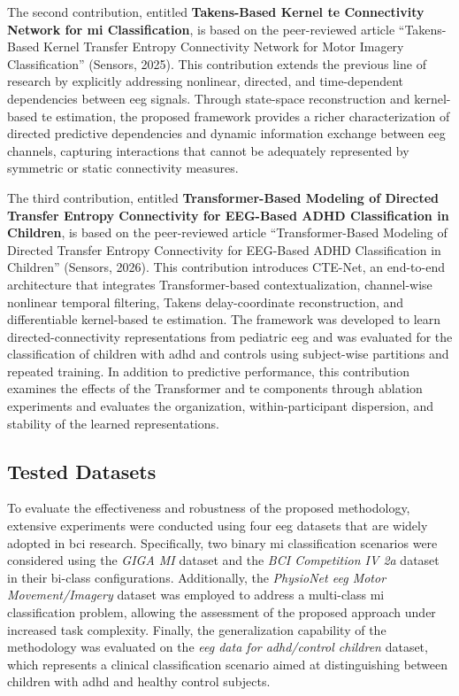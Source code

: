 The second contribution, entitled \textbf{Takens-Based Kernel \gls{te} Connectivity Network for \gls{mi} Classification}, is based on the peer-reviewed article ``Takens-Based Kernel Transfer Entropy Connectivity Network for Motor Imagery Classification'' (Sensors, 2025). This contribution extends the previous line of research by explicitly addressing nonlinear, directed, and time-dependent dependencies between \gls{eeg} signals. Through state-space reconstruction and kernel-based \gls{te} estimation, the proposed framework provides a richer characterization of directed predictive dependencies and dynamic information exchange between \gls{eeg} channels, capturing interactions that cannot be adequately represented by symmetric or static connectivity measures.

The third contribution, entitled \textbf{Transformer-Based Modeling of Directed Transfer Entropy Connectivity for EEG-Based ADHD Classification in Children}, is based on the peer-reviewed article ``Transformer-Based Modeling of Directed Transfer Entropy Connectivity for EEG-Based ADHD Classification in Children'' (Sensors, 2026). This contribution introduces CTE-Net, an end-to-end architecture that integrates Transformer-based contextualization, channel-wise nonlinear temporal filtering, Takens delay-coordinate reconstruction, and differentiable kernel-based \gls{te} estimation. The framework was developed to learn directed-connectivity representations from pediatric \gls{eeg} and was evaluated for the classification of children with \gls{adhd} and controls using subject-wise partitions and repeated training. In addition to predictive performance, this contribution examines the effects of the Transformer and \gls{te} components through ablation experiments and evaluates the organization, within-participant dispersion, and stability of the learned representations.

\subsection{Tested Datasets}\label{sec:datasets2}

To evaluate the effectiveness and robustness of the proposed methodology, extensive experiments were conducted using four \gls{eeg} datasets that are widely adopted in \gls{bci} research. Specifically, two binary \gls{mi} classification scenarios were considered using the \textit{GIGA MI} dataset and the \textit{BCI Competition IV 2a} dataset in their bi-class configurations. Additionally, the \textit{PhysioNet \gls{eeg} Motor Movement/Imagery} dataset was employed to address a multi-class \gls{mi} classification problem, allowing the assessment of the proposed approach under increased task complexity. Finally, the generalization capability of the methodology was evaluated on the \textit{\gls{eeg} data for \gls{adhd}/control children} dataset, which represents a clinical classification scenario aimed at distinguishing between children with \gls{adhd} and healthy control subjects.

